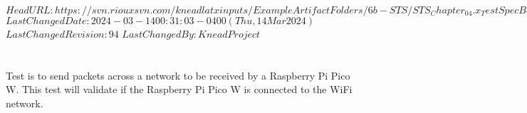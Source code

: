 \svnidlong
{$HeadURL: https://svn.riouxsvn.com/kneadlatxinputs/ExampleArtifactFolders/6b-STS/STS_Chapter_04.x_TestSpecBase.tex $}
{$LastChangedDate: 2024-03-14 00:31:03 -0400 (Thu, 14 Mar 2024) $}
{$LastChangedRevision: 94 $}
{$LastChangedBy: KneadProject $}

\section{\StsTestSpecID}
\label{loc:Test\StsTestSpecID}
% 

Test   is to send packets across a network to be received by a Raspberry Pi Pico W. This test will validate if the Raspberry Pi Pico W is connected to the WiFi network.

\renewcommand{\StsTestCaseID}{Packets}%

\DIDINFOOFF%


